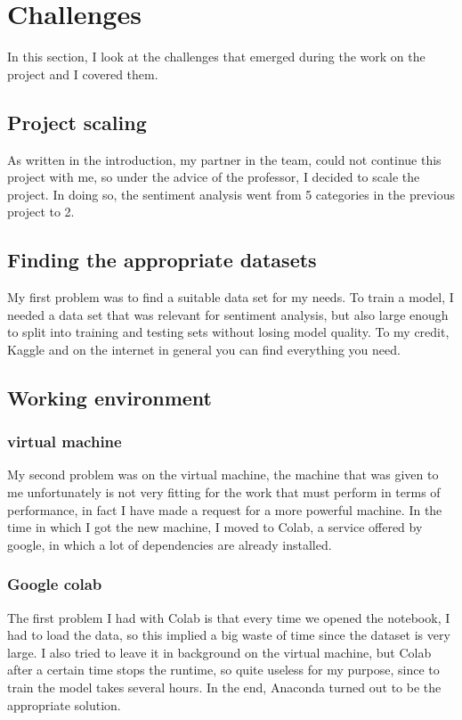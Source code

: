 \section{Challenges}
In this section, I look at the challenges that emerged during the work on the project and I covered them.
\subsection{Project scaling}
As written in the introduction, my partner in the team, could not continue this project with me, so under the advice of the professor, I decided to scale the project.
In doing so, the sentiment analysis went from 5 categories in the previous project to 2.

\subsection{Finding the appropriate \gls{dataset}s} 
My first problem was to find a suitable data set for my needs. To train a model, I needed a data set that was relevant for sentiment analysis, but also large enough to split into training and testing sets without losing model quality. To my credit, Kaggle and on the internet in general you can find everything you need.
\subsection{Working environment}
\subsubsection{\gls{virtual machine}}
My second problem was on the virtual machine, the machine that was given to me unfortunately is not very fitting for the work that must perform in terms of performance, in fact I have made a request for a more powerful machine. In the time in which I got the new machine, I moved to Colab, a service offered by google, in which a lot of dependencies are already installed.

\subsubsection{Google \gls{colab}}
The first problem I had with Colab is that every time we opened the notebook, I had to load the data, so this implied a big waste of time since the dataset is very large. I also tried to leave it in background on the virtual machine, but Colab after a certain time stops the runtime, so quite useless for my purpose, since to train the model takes several hours.
In the end, Anaconda turned out to be the appropriate solution.

